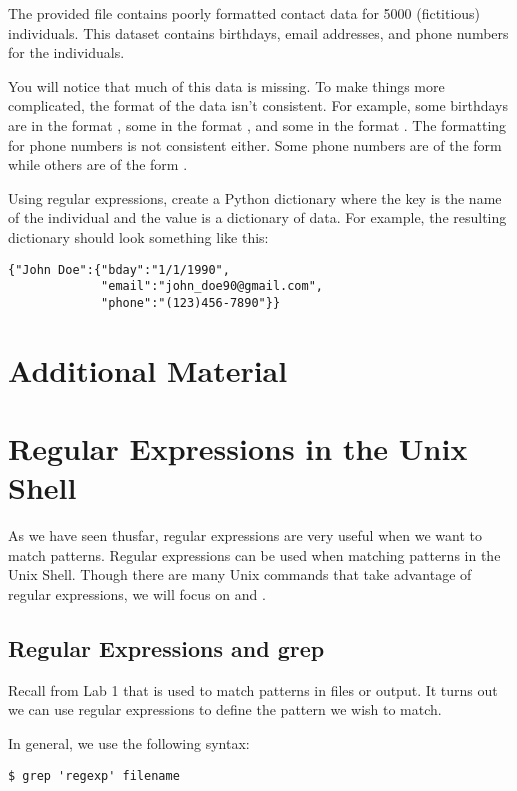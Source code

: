 \begin{problem}
The provided file  contains poorly formatted contact data for 5000 (fictitious) individuals. This dataset contains birthdays, email addresses, and phone numbers for the individuals.

You will notice that much of this data is missing. To make things more complicated, the format of the data isn't consistent. For example, some birthdays are in the format , some in the format , and some in the format . The formatting for phone numbers is not consistent either. Some phone numbers are of the form  while others are of the form .

Using regular expressions, create a Python dictionary where the key is the name of the individual and the value is a dictionary of data. For example, the resulting dictionary should look something like this:
\begin{lstlisting}
{"John Doe":{"bday":"1/1/1990",
             "email":"john_doe90@gmail.com",
             "phone":"(123)456-7890"}}
\end{lstlisting}

\end{problem}

\newpage

\section*{Additional Material}

\section*{Regular Expressions in the Unix Shell}
As we have seen thusfar, regular expressions are very useful when we want to match patterns. Regular expressions can be used when matching patterns in the Unix Shell. Though there are many Unix commands that take advantage of regular expressions, we will focus on  and .

\subsection*{Regular Expressions and grep}
Recall from Lab 1 that  is used to match patterns in files or output. It turns out we can use regular expressions to define the pattern we wish to match.

In general, we use the following syntax:
\begin{lstlisting}
$ grep 'regexp' filename
\end{lstlisting}

